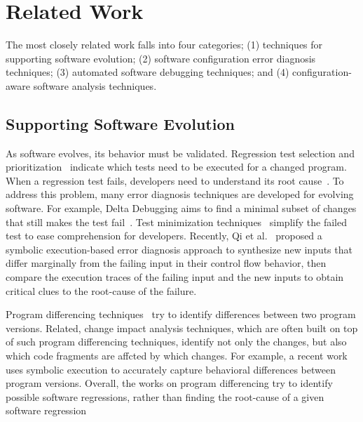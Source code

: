 \section{Related Work}
\label{sec:related}

The most closely related work falls into
four categories; (1) techniques for
supporting software evolution; (2) software
configuration error diagnosis techniques;
(3) automated software debugging techniques;
and (4) configuration-aware software analysis techniques.

\subsection{Supporting Software Evolution}

As software evolves, its behavior must be validated.
Regression test selection and prioritization~\cite{}
indicate which tests need to be executed for a changed
program. When a regression test fails, developers need
to understand its root cause~\cite{}. To address this
problem, many error diagnosis techniques are developed for evolving
software. For example, Delta Debugging aims to find a minimal
subset of changes that still makes the test fail~\cite{}.
Test minimization techniques~\cite{} simplify the failed
test to ease comprehension for developers. Recently,
Qi et al.~\cite{} proposed a symbolic execution-based
error diagnosis approach to synthesize new inputs that
differ marginally from the failing input in their
control flow behavior, then compare the execution traces
of the failing input and the new inputs to obtain critical
clues to the root-cause of the failure.  


Program differencing techniques~\cite{} try to identify
differences between two program versions.
Related, change impact analysis techniques, which
are often built on top of such program differencing
techniques, identify not only the changes, but also
which code fragments are affcted by which
changes. For example, a recent work~\cite{} uses symbolic
execution to accurately capture behavioral differences
between program versions. 
 Overall, the works on program
differencing try to identify possible software regressions,
rather than finding the root-cause of a given software regression

